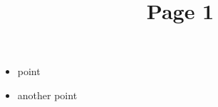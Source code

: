 \documentclass[a4]{seminar}
\begin{document}
\begin{slide}

\title{Page 1}

\begin{itemize}
\item point
\item another point
\end{itemize}

\end{slide}
\end{document}
